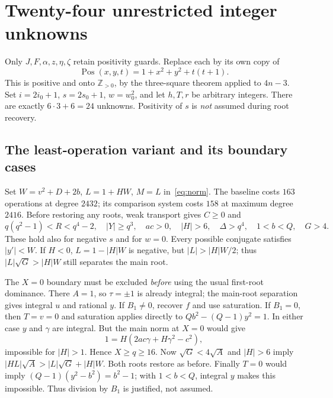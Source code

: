 \documentclass[11pt]{article}
\newcommand{\PP}{\mathbb Z_{>0}}
\begin{document}
\section{Twenty-four unrestricted integer unknowns}
Only $J,F,\alpha,z,\eta,\zeta$ retain positivity guards. Replace each by its
own copy of
\[
 \operatorname{Pos}(x,y,t)=1+x^2+y^2+t(t+1).
\]
This is positive and onto $\PP$, by the three-square theorem applied to
$4n-3$. Set $i=2i_0+1$, $s=2s_0+1$, $w=w_0^2$, and let $h,T,r$ be arbitrary
integers. There are exactly $6\cdot3+6=24$ unknowns. Positivity of $s$ is
\emph{not} assumed during root recovery.

\subsection{The least-operation variant and its boundary cases}
Set $W=v^2+D+2b$, $L=1+HW$, $M=L$ in~\eqref{eq:norm}.
The baseline costs $163$ operations at degree $2432$; its comparison system
costs $158$ at maximum degree $2416$. Before restoring any roots, weak
transport gives $C\ge0$ and
\[
 q(q^2-1)<R<q^4-2,\quad |Y|\ge q^3,\quad
 ac>0,\quad |H|>6,\quad \Delta>q^4,
 \quad 1<b<Q,\quad G>4.
\]
These hold also for negative $s$ and for $w=0$. Every possible conjugate
satisfies $|y'|<W$. If $H<0$, $L=1-|H|W$ is negative, but
$|L|>|H|W/2$; thus $|L|\sqrt G>|H|W$ still separates the main root.

The $X=0$ boundary must be excluded \emph{before} using the usual first-root
dominance. There $A=1$, so $\tau=\pm1$ is already integral; the main-root
separation gives integral $u$ and rational $y$. If $B_1\ne0$, recover $f$
and use saturation. If $B_1=0$, then $T=v=0$ and saturation applies directly
to $Qb^2-(Q-1)y^2=1$. In either case $y$ and $\gamma$ are integral. But the
main norm at $X=0$ would give
\[
 1=H(2ac\gamma+H\gamma^2-c^2),
\]
impossible for $|H|>1$. Hence $X\ge q\ge16$.
Now $\sqrt G<4\sqrt A$ and $|H|>6$ imply
$|HL|\sqrt A>|L|\sqrt G+|H|W$. Both roots restore as before.
Finally $T=0$ would imply $(Q-1)(y^2-b^2)=b^2-1$; with $1<b<Q$, integral
$y$ makes this impossible. Thus division by $B_1$ is justified, not assumed.
\end{document}
